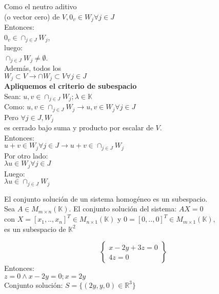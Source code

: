 \begin{poof}

    Como el neutro aditivo\\ (o vector cero) de $V,0_v\in W_j \forall j\in J$\\
    Entonces:\\ $0_v \in \cap_{j\in J} W_j$,\\
    luego:\\ $\cap_{j\in J} W_j \neq \emptyset$.\\
    Adem\'{a}s, todos los\\
    $W_j \subset V \to \cap W_j \subset V \forall j\in J$\\
    \textbf{Apliquemos el criterio de subespacio}\\
    Sean:
    $u,v \in \cap_{j\in J} W_j; \lambda\in\mathbb{K} $\\
    Como: $u,v \in \cap_{j\in J} W_j \to u,v \in W_j \forall j\in J$\\
    Pero $\forall j\in J,W_j $\\
    es cerrado bajo suma y producto por escalar de $V$.\\
    Entonces:\\
    $u+v\in W_j \forall j\in J \to u+v \in \cap _{j\in J} W_j$\\
    Por otro lado:\\
    $\lambda u \in W_j \forall j\in J$\\
    Luego: \\$\lambda u \in \cap_{j\in J}W_j$

\end{poof}

\begin{propo}
    El conjunto soluci\'{o}n de un sistema homog\'{e}neo es un subespacio.\\

    Sea $A\in M_{m\times n}(\mathbb{K}).$
    El conjunto soluci\'{o}n del sistema:
    $AX=0$\\
    con $X=[x_1,..,x_n]^T\in M_{n\times 1}(\mathbb{K})$
    y $0=[0,..,0]^T\in M_{m\times 1}(\mathbb{K}),$\\ es un subespacio de $\mathbb{K}^2$
\end{propo}

\begin{ejem}
   \[ \left\{ \begin{array}{c}
        x-2y+3z=0 \\
         4z=0
   \end{array}  \right\}\] Entonces: \\
    $ z=0 \land x-2y = 0; x=2y$\\
    Conjunto soluci\'{o}n:
    $S=\{(2y,y,0)\in \mathbb{R}^3\}$


\end{ejem}



